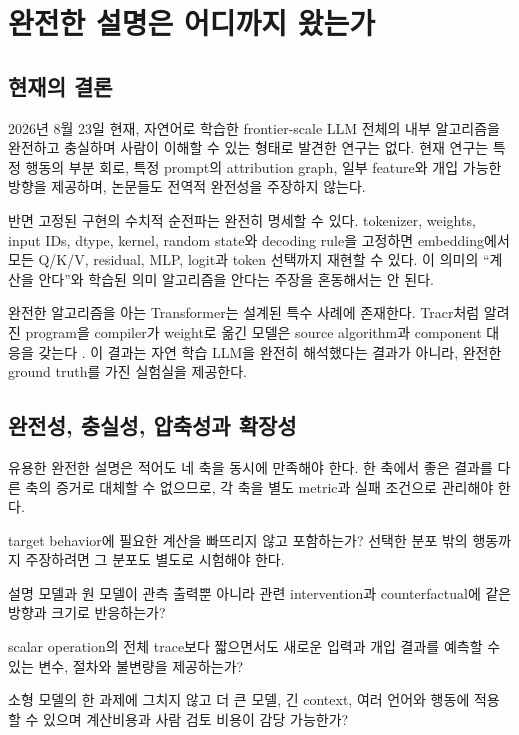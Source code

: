\chapter{완전한 설명은 어디까지 왔는가}
\label{chap:conclusion}

\section{현재의 결론}

2026년 8월 23일 현재, 자연어로 학습한 frontier-scale LLM 전체의 내부 알고리즘을 완전하고 충실하며 사람이 이해할 수 있는 형태로 발견한 연구는 없다.
현재 연구는 특정 행동의 부분 회로, 특정 prompt의 attribution graph, 일부 feature와 개입 가능한 방향을 제공하며, 논문들도 전역적 완전성을 주장하지 않는다.

반면 고정된 구현의 수치적 순전파는 완전히 명세할 수 있다.
tokenizer, weights, input IDs, dtype, kernel, random state와 decoding rule을 고정하면 embedding에서 모든 Q/K/V, residual, MLP, logit과 token 선택까지 재현할 수 있다.
이 의미의 ``계산을 안다''와 학습된 의미 알고리즘을 안다는 주장을 혼동해서는 안 된다.

완전한 알고리즘을 아는 Transformer는 설계된 특수 사례에 존재한다.
Tracr처럼 알려진 program을 compiler가 weight로 옮긴 모델은 source algorithm과 component 대응을 갖는다 \citep{lindner2023tracr}.
이 결과는 자연 학습 LLM을 완전히 해석했다는 결과가 아니라, 완전한 ground truth를 가진 실험실을 제공한다.

\section{완전성, 충실성, 압축성과 확장성}

유용한 완전한 설명은 적어도 네 축을 동시에 만족해야 한다.
한 축에서 좋은 결과를 다른 축의 증거로 대체할 수 없으므로, 각 축을 별도 metric과 실패 조건으로 관리해야 한다.

\begin{description}[style=nextline,leftmargin=2em]
  \item[완전성]
  target behavior에 필요한 계산을 빠뜨리지 않고 포함하는가?
  선택한 분포 밖의 행동까지 주장하려면 그 분포도 별도로 시험해야 한다.

  \item[인과적 충실성]
  설명 모델과 원 모델이 관측 출력뿐 아니라 관련 intervention과 counterfactual에 같은 방향과 크기로 반응하는가?

  \item[압축성과 인간 이해 가능성]
  scalar operation의 전체 trace보다 짧으면서도 새로운 입력과 개입 결과를 예측할 수 있는 변수, 절차와 불변량을 제공하는가?

  \item[확장성]
  소형 모델의 한 과제에 그치지 않고 더 큰 모델, 긴 context, 여러 언어와 행동에 적용할 수 있으며 계산비용과 사람 검토 비용이 감당 가능한가?
\end{description}

